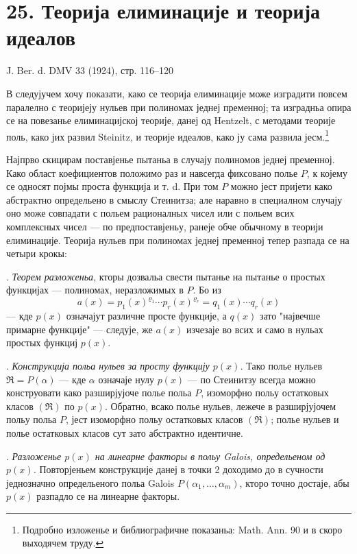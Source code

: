 ﻿\documentclass[11pt]{article}
\providecommand{\frakR}{\mathfrak R}
\begin{document}
\setcounter{footnote}{0}

\section*{25. Теорија елиминације и теорија идеалов}

\begin{center}
J. Ber. d. DMV 33 (1924), стр. 116--120
\end{center}

В следујучем хочу показати, како се теорија елиминације може изградити повсем паралелно с теоријеју нульев при полиномах једнеј пременној; та изградньа опира се на повезанье елиминацијској теорије, данеј од Hentzelt, с методами теорије поль, како јих развил Steinitz, и теорије идеалов, како ју сама развила јесм.\footnote{Подробно изложенье и библиографичне показаньа: Math. Ann. 90 и в скоро выходячем труду.}

Најпрво скицирам поставјенье пытаньа в случају полиномов једнеј пременној. Како област коефициентов положимо раз и навсегда фиксовано полье $P$, к којему се односят појмы проста функција и т. d. При том $P$ можно јест пријети како абстрактно определьено в смыслу Стеинитза; але наравно в специалном случају оно може совпадати с польем рационалных чисел или с польем всих комплексных чисел --- по предпоставјеньу, ранеје обче обычному в теорији елиминације. Теорија нульев при полиномах једнеј пременној тепер разпада се на четыри крокы:

. \emph{Теорем разложеньа}, кторы дозвальа свести пытанье на пытанье о простых функцијах --- полиномах, неразложимых в $P$. Бо из
\[
 a(x)=p_1(x)^{\varrho_1}\cdots p_r(x)^{\varrho_r}=q_1(x)\cdots q_r(x)
\]
--- кде $p(x)$ означајут различне просте функције, а $q(x)$ зато "највечше примарне функције" --- следује, же $a(x)$ изчезаје во всих и само в нульах простых функциј $p(x)$.

. \emph{Конструкција польа нульев за просту функцију $p(x)$.} Тако полье нульев $\frakR=P(\alpha)$ --- кде $\alpha$ означаје нулу $p(x)$ --- по Стеинитзу всегда можно конструовати како разширјујоче полье польа $P$, изоморфно польу остатковых класов $(\frakR)$ по $p(x)$. Обратно, всако полье нульев, лежече в разширјујочем польу польа $P$, јест изоморфно польу остатковых класов $(\frakR)$; полье нульев и полье остатковых класов сут зато абстрактно идентичне.

. \emph{Разложенье $p(x)$ на линеарне факторы в польу Galois, определьеном од $p(x)$.} Повторјеньем конструкције данеј в точки 2 доходимо до в сучности једнозначно определьеного польа Galois $P(\alpha_1,\ldots,\alpha_m)$, кторо точно достаје, абы $p(x)$ разпадло се на линеарне факторы.
\end{document}
